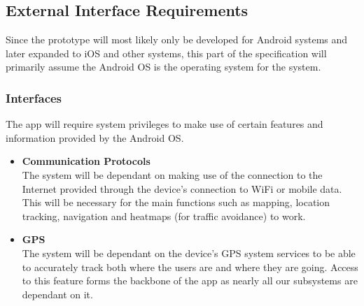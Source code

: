 \documentclass[english]{article}
\begin{document}
				\subsection{External Interface Requirements}
					    Since the prototype will most likely only be developed for Android systems and later expanded to iOS and other systems, this part of the specification will primarily assume the Android OS is the operating system for the system.
					    \subsubsection{Interfaces} 
					     The app will require system privileges to make use of certain features and information provided by the Android OS.
					    \begin{itemize}
					        \item  \textbf{Communication Protocols}\\
					        The system will be dependant on making use of the connection to the Internet provided through the device's connection to WiFi or mobile data. This will be necessary for the main functions such as mapping, location tracking, navigation and heatmaps (for traffic avoidance) to work.
					        \item \textbf{GPS}\\
					        The system will be dependant on the device's GPS system services to be able to accurately track both where the users are and where they are going. Access to this feature forms the backbone of the app as nearly all our subsystems are dependant on it.
					    \end{itemize}
\end{document}
